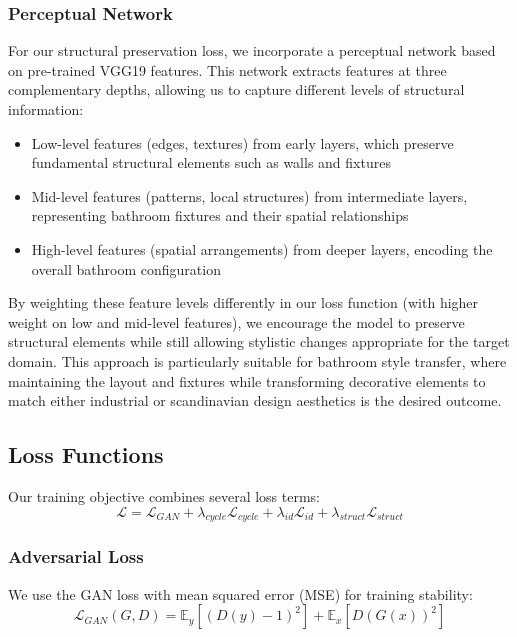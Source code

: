 \documentclass[twocolumn,superscriptaddress,aps]{revtex4-1}
\begin{document}
\subsubsection{Perceptual Network}

For our structural preservation loss, we incorporate a perceptual network based on pre-trained VGG19 features. This network extracts features at three complementary depths, allowing us to capture different levels of structural information:

\begin{itemize}
    \item Low-level features (edges, textures) from early layers, which preserve fundamental structural elements such as walls and fixtures
    \item Mid-level features (patterns, local structures) from intermediate layers, representing bathroom fixtures and their spatial relationships
    \item High-level features (spatial arrangements) from deeper layers, encoding the overall bathroom configuration
\end{itemize}

By weighting these feature levels differently in our loss function (with higher weight on low and mid-level features), we encourage the model to preserve structural elements while still allowing stylistic changes appropriate for the target domain. This approach is particularly suitable for bathroom style transfer, where maintaining the layout and fixtures while transforming decorative elements to match either industrial or scandinavian design aesthetics is the desired outcome.

\subsection{Loss Functions}
Our training objective combines several loss terms:
\begin{equation}
\mathcal{L} = \mathcal{L}_{GAN} + \lambda_{cycle}\mathcal{L}_{cycle} + \lambda_{id}\mathcal{L}_{id} + \lambda_{struct}\mathcal{L}_{struct}
\end{equation}

\subsubsection{Adversarial Loss}
We use the GAN loss with mean squared error (MSE) for training stability:
\begin{equation}
\mathcal{L}_{GAN}(G, D) = \mathbb{E}_{y}[(D(y) - 1)^2] + \mathbb{E}_{x}[D(G(x))^2]
\end{equation}
\end{document}
